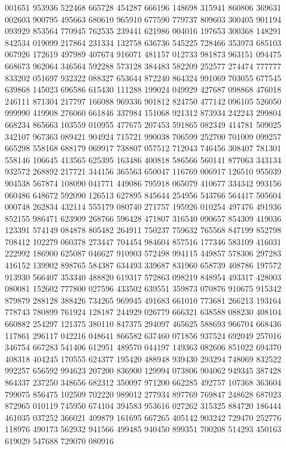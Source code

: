 {001651 953936 522468 665728 454287 666196 148698 315941 860806 369631 002603%
900795 495663 680610 965910 677590 779737 809603 300405 901194 093929 853564%
770945 762535 239441 621986 004016 197653 300368 148291 842534 019099 217864%
231334 132758 636736 545225 728466 353973 685103 067926 172619 497989 407674%
916071 481157 012733 981873 963151 094475 668673 962064 346564 592288 573128%
384483 582209 252577 274474 777777 833202 051697 932322 088327 653644 872240%
864324 991069 703055 677545 639868 145023 696586 615430 111288 199024 049929%
427687 098868 476018 246111 871304 217797 166088 969336 901812 824750 477142%
096105 526050 999990 419908 276060 661846 337984 151068 921312 873934 242243%
299804 668234 865663 103559 010955 477675 207453 591865 082349 414781 509025%
342107 967363 089421 904924 715721 990038 706599 252700 701009 099257 665298%
558168 688179 069917 738807 057512 712043 746456 308407 781301 558146 106645%
413565 625395 163486 400818 586566 560141 877063 343134 932572 268892 217721%
344156 365563 650047 116769 006917 126510 955039 904538 567874 108090 041771%
449086 795918 065079 410677 334342 993156 060486 648672 592090 126513 627895%
845644 254956 543766 564417 505604 000748 262834 432114 555179 080740 271757%
195926 010254 497476 491936 852155 986471 623909 268766 596428 471807 316540%
090657 854309 419036 123391 574149 084878 805482 264911 750237 759632 765568%
847199 852798 708412 102279 060378 273447 704454 984604 857516 177346 583109%
416031 222992 186900 625087 046627 910903 572498 994115 449857 578306 297283%
416152 139902 898765 584387 634493 339687 831960 658739 408786 197572 913930%
566407 353340 488820 619317 572863 098219 848954 493317 428003 080081 152602%
777800 027596 433502 639551 359873 070876 910675 915342 879879 288128 388426%
734265 969945 491683 661010 773681 266213 193164 778743 780899 761924 128187%
244929 026779 666321 638588 088230 408104 660882 254297 121375 380110 847375%
294097 465625 588693 966704 668436 117861 296117 042216 048641 866582 637460%
071856 937524 692049 257016 346754 667283 541406 612951 489570 044197 149363%
082606 851022 694370 408318 404245 170555 624377 195420 488948 939430 293294%
748069 832522 992257 656592 994623 207200 836900 129994 073806 904062 949345%
387428 864337 237250 348656 682312 350097 971200 662285 492757 107368 363604%
799075 856475 102509 702220 989012 277934 897769 769847 248628 687023 872965%
010119 745950 674104 394583 953616 027262 315325 884720 186444 461035 037252%
366021 409879 161695 667265 405142 903242 729470 252776 118976 490173 562932%
941566 499485 940450 899351 700208 514293 450163 619029 547688 729070 080916%
}
